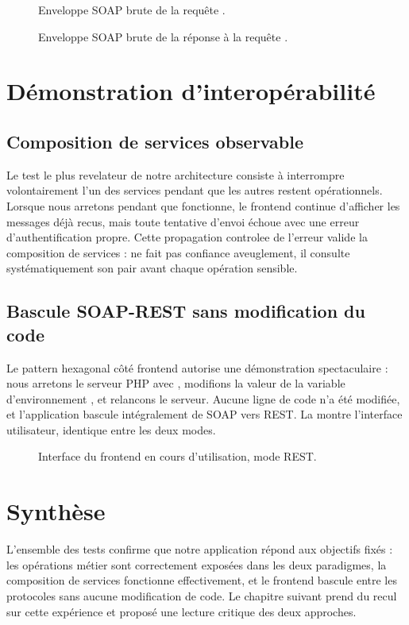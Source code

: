 \begin{figure}[ht]
  \centering
  \fbox{\rule{0pt}{6cm}\rule{12cm}{0pt}}
  \caption{Enveloppe SOAP brute de la requête .}
  \label{fig:soapui-raw-request}
\end{figure}

\begin{figure}[ht]
  \centering
  \fbox{\rule{0pt}{6cm}\rule{12cm}{0pt}}
  \caption{Enveloppe SOAP brute de la réponse à la requête .}
  \label{fig:soapui-raw-response}
\end{figure}

\section{Démonstration d'interopérabilité}

\subsection{Composition de services observable}

Le test le plus revelateur de notre architecture consiste à interrompre volontairement l'un des services pendant que les autres restent opérationnels. Lorsque nous arretons  pendant que  fonctionne, le frontend continue d'afficher les messages déjà recus, mais toute tentative d'envoi échoue avec une erreur d'authentification propre. Cette propagation controlee de l'erreur valide la composition de services :  ne fait pas confiance aveuglement, il consulte systématiquement son pair avant chaque opération sensible.

\subsection{Bascule SOAP-REST sans modification du code}

Le pattern hexagonal côté frontend autorise une démonstration spectaculaire : nous arretons le serveur PHP avec , modifions la valeur de la variable d'environnement , et relancons le serveur. Aucune ligne de code n'a été modifiée, et l'application bascule intégralement de SOAP vers REST. La  montre l'interface utilisateur, identique entre les deux modes.

\begin{figure}[ht]
  \centering
  \fbox{\rule{0pt}{8cm}\rule{12cm}{0pt}}
  \caption{Interface du frontend en cours d'utilisation, mode REST.}
  \label{fig:frontend-chat}
\end{figure}

\section{Synthèse}

L'ensemble des tests confirme que notre application répond aux objectifs fixés : les opérations métier sont correctement exposées dans les deux paradigmes, la composition de services fonctionne effectivement, et le frontend bascule entre les protocoles sans aucune modification de code. Le chapitre suivant prend du recul sur cette expérience et proposé une lecture critique des deux approches.

